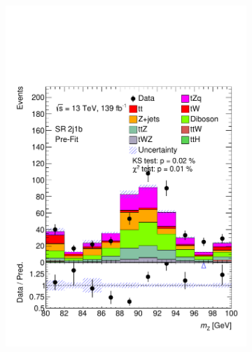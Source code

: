 \begin{figure}[!h]
\begin{subfigure}[b]{0.33\linewidth}
    \includegraphics[width=\linewidth]{ubonn-thesis/Chapters/Chapters_06/Figure/Input_distribution/SR_2j1b_MZ.pdf} 
  \end{subfigure}%
  \begin{subfigure}[b]{0.33\linewidth}
    \centering

\end{subfigure}
\end{figure}
